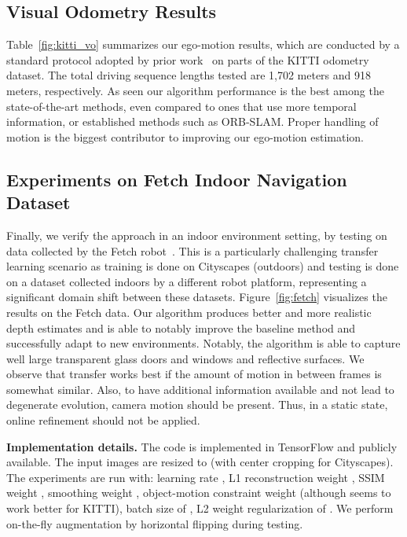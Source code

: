 \documentclass[letterpaper]{article} \usepackage{aaai19}  \usepackage{times}  \usepackage{helvet}  \usepackage{courier}  \usepackage{url}  \usepackage{graphicx}  \frenchspacing
\begin{document}
\subsection{Visual Odometry Results}
Table~\ref{fig:kitti_vo} summarizes our ego-motion results, which are conducted by a standard protocol adopted by prior work~\cite{zhou2017unsupervised,godard2018digging} on parts of the KITTI odometry dataset. The total driving sequence lengths tested are 1,702 meters and 918 meters, respectively.
As seen our algorithm performance is the best among the state-of-the-art methods, even compared to ones that use more temporal information, or established methods such as ORB-SLAM. Proper handling of motion is the biggest contributor to improving our ego-motion estimation.

\subsection{Experiments on Fetch Indoor Navigation Dataset}

Finally, we verify the approach in an indoor environment setting, by testing on data collected by the Fetch robot~\cite{wise2016fetch}. This is a particularly challenging transfer learning scenario as training is done on Cityscapes (outdoors) and testing is done on a dataset collected indoors by a different robot platform, representing a significant domain shift between these datasets.
Figure~\ref{fig:fetch} visualizes the results on the Fetch data. Our algorithm produces better and more realistic depth estimates and is able to notably improve the baseline method and successfully adapt to new environments. 
Notably, the algorithm is able to capture well large transparent glass doors and windows and reflective surfaces. We observe that transfer works best if the amount of motion in between frames is somewhat similar. Also, to have additional information available and not lead to degenerate evolution, camera motion should be present. Thus, in a static state, online refinement should not be applied.

\textbf{Implementation details.}
The code is implemented in TensorFlow and publicly available. The input images are resized to  (with center cropping for Cityscapes).
The experiments are run with: learning rate , L1 reconstruction weight , SSIM weight , smoothing weight , object-motion constraint weight  (although  seems to work better for KITTI), batch size of , L2 weight regularization of . We perform on-the-fly augmentation by horizontal flipping during testing.
\end{document}

